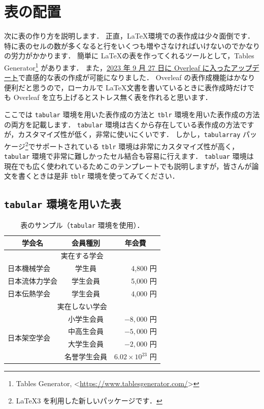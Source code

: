\section{表の配置}
\label{sec:table}

次に表の作り方を説明します．
正直，\LaTeX 環境での表作成は少々面倒です．
特に表のセルの数が多くなると行をいくつも増やさなければいけないのでかなりの労力がかかります．
簡単に \LaTeX の表を作ってくれるツールとして，Tables Generator\footnote{Tables Generator, \textless\url{https://www.tablesgenerator.com/}\textgreater} があります．
また，\href{https://www.overleaf.com/blog/major-feature-news-add-and-edit-tables-without-writing-code}{2023 年 9 月 27 日に Overleaf に入ったアップデート}で直感的な表の作成が可能になりました．
Overleaf の表作成機能はかなり便利だと思うので，ローカルで \LaTeX 文書を書いているときに表作成時だけでも Overleaf を立ち上げるとストレス無く表を作れると思います．

ここでは \verb|tabular| 環境を用いた表作成の方法と \verb|tblr| 環境を用いた表作成の方法の両方を記載します．
\verb|tabular| 環境は古くから存在している表作成の方法ですが，カスタマイズ性が低く，非常に使いにくいです．
しかし，\verb|tabularray| パッケージ\footnote{\LaTeX3 を利用した新しいパッケージです．}でサポートされている \verb|tblr| 環境は非常にカスタマイズ性が高く，\verb|tabular| 環境で非常に難しかったセル結合も容易に行えます．
\verb|tabluar| 環境は現在でも広く使われているためこのテンプレートでも説明しますが，皆さんが論文を書くときは是非 \verb|tblr| 環境を使ってみてください．

\subsection{\texttt{tabular} 環境を用いた表}
\label{ssec:tabular}

\begin{table}[tp]
    \centering
    \caption{表のサンプル（\texttt{tabular} 環境を使用）．}
    \label{table:tabular}
    \begin{tabular}{l|c|r} \hline\hline
        \multicolumn{1}{c|}{学会名}  & 会員種別  & \multicolumn{1}{c}{年会費} \\ \hline
        \multicolumn{3}{c}{実在する学会} \\ \hline
        日本機械学会    & 学生員    & 4,800 円 \\ \hline
        日本流体力学会  & 学生会員  & 5,000 円 \\ \hline
        日本伝熱学会    & 学生会員  & 4,000 円 \\ \hline
        \multicolumn{3}{c}{実在しない学会} \\ \hline
        \multirow{4}{*}{日本架空学会}& 小学生会員  & $-8,000$ 円 \\ \cline{2-3}
        & 中高生会員  & $-5,000$ 円 \\ \cline{2-3}
        & 大学生会員  & $-2,000$ 円 \\ \cline{2-3}
        & 名誉学生会員  & $6.02 \times 10^{23}$ 円 \\ \hline
    \end{tabular}
\end{table}

